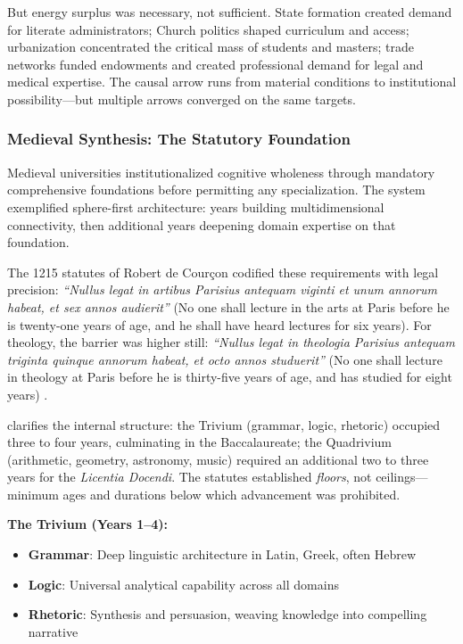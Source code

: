 But energy surplus was necessary, not sufficient. State formation created demand for literate administrators; Church politics shaped curriculum and access; urbanization concentrated the critical mass of students and masters; trade networks funded endowments and created professional demand for legal and medical expertise. The causal arrow runs from material conditions to institutional possibility---but multiple arrows converged on the same targets.

\subsubsection{Medieval Synthesis: The Statutory Foundation}

Medieval universities institutionalized cognitive wholeness through mandatory comprehensive foundations before permitting any specialization. The system exemplified sphere-first architecture: years building multidimensional connectivity, then additional years deepening domain expertise on that foundation.

The 1215 statutes of Robert de Courçon codified these requirements with legal precision: \textit{``Nullus legat in artibus Parisius antequam viginti et unum annorum habeat, et sex annos audierit''} (No one shall lecture in the arts at Paris before he is twenty-one years of age, and he shall have heard lectures for six years). For theology, the barrier was higher still: \textit{``Nullus legat in theologia Parisius antequam triginta quinque annorum habeat, et octo annos studuerit''} (No one shall lecture in theology at Paris before he is thirty-five years of age, and has studied for eight years) \citep[Vol.~I, No.~20, pp.~78--79]{denifle1889}.

\citet[pp.~433--437]{rashdall1895} clarifies the internal structure: the Trivium (grammar, logic, rhetoric) occupied three to four years, culminating in the Baccalaureate; the Quadrivium (arithmetic, geometry, astronomy, music) required an additional two to three years for the \textit{Licentia Docendi}. The statutes established \textit{floors}, not ceilings---minimum ages and durations below which advancement was prohibited.

\textbf{The Trivium (Years 1--4):}
\begin{itemize}
    \item \textbf{Grammar}: Deep linguistic architecture in Latin, Greek, often Hebrew
    \item \textbf{Logic}: Universal analytical capability across all domains
    \item \textbf{Rhetoric}: Synthesis and persuasion, weaving knowledge into compelling narrative
\end{itemize}

